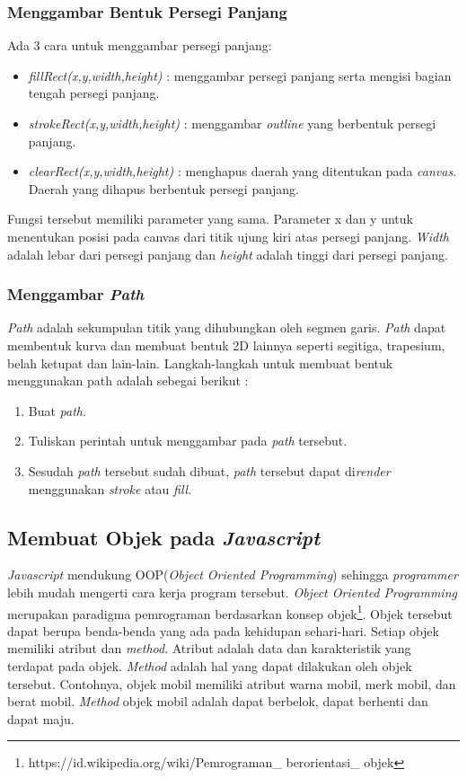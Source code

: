 \subsubsection{Menggambar Bentuk Persegi Panjang}
Ada 3 cara untuk menggambar persegi panjang:

\begin{itemize}
	\item \textit{fillRect(x,y,width,height)} : menggambar persegi panjang serta mengisi bagian tengah persegi panjang.
	\item \textit{strokeRect(x,y,width,height)} : menggambar \textit{outline} yang berbentuk persegi panjang.
	\item \textit{clearRect(x,y,width,height)} : menghapus daerah yang ditentukan pada \textit{canvas}. Daerah yang dihapus berbentuk persegi panjang.
\end{itemize}

Fungsi tersebut memiliki parameter yang sama. Parameter x dan y untuk menentukan posisi pada canvas dari titik ujung kiri atas persegi panjang. \textit{Width} adalah lebar dari persegi panjang dan \textit{height} adalah tinggi dari persegi panjang.

\subsubsection{Menggambar \textit{Path}}
\textit{Path} adalah sekumpulan titik yang dihubungkan oleh segmen garis. \textit{Path} dapat membentuk kurva dan membuat bentuk 2D lainnya seperti segitiga, trapesium, belah ketupat dan lain-lain. Langkah-langkah untuk membuat bentuk menggunakan path adalah sebegai berikut : 

\begin{enumerate}
	\item Buat \textit{path}.
	\item Tuliskan perintah untuk menggambar pada \textit{path} tersebut.
	\item Sesudah \textit{path} tersebut sudah dibuat, \textit{path} tersebut dapat di\textit{render} menggunakan \textit{stroke} atau \textit{fill}.
\end{enumerate}


\subsection{Membuat Objek pada \textit{Javascript}}
\textit{Javascript} mendukung OOP(\textit{Object Oriented Programming}) sehingga \textit{programmer} lebih mudah mengerti cara kerja program tersebut. \textit{Object Oriented Programming} merupakan paradigma pemrograman berdasarkan konsep objek\footnote{https://id.wikipedia.org/wiki/Pemrograman\_ berorientasi\_ objek}. Objek tersebut dapat berupa benda-benda yang ada pada kehidupan sehari-hari. Setiap objek memiliki atribut dan \textit{method}. Atribut adalah data dan karakteristik yang terdapat pada objek. \textit{Method} adalah hal yang dapat dilakukan oleh objek tersebut. Contohnya, objek mobil memiliki atribut warna mobil, merk mobil, dan berat mobil. \textit{Method} objek mobil adalah dapat berbelok, dapat berhenti dan dapat maju. \\

